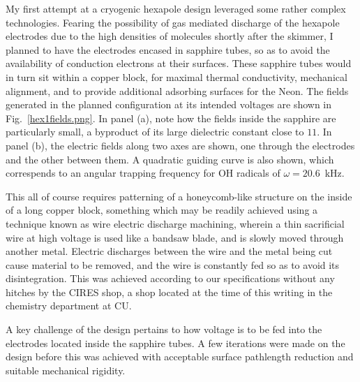 My first attempt at a cryogenic hexapole design leveraged some rather complex technologies.
Fearing the possibility of gas mediated discharge of the hexapole electrodes due to the high densities of molecules shortly after the skimmer, I planned to have the electrodes encased in sapphire tubes, so as to avoid the availability of conduction electrons at their surfaces.
These sapphire tubes would in turn sit within a copper block, for maximal thermal conductivity, mechanical alignment, and to provide additional adsorbing surfaces for the Neon.
The fields generated in the planned configuration at its intended voltages are shown in Fig.~\ref{hex1fields.png}.
In panel (a), note how the fields inside the sapphire are particularly small, a byproduct of its large dielectric constant close to $11$.
In panel (b), the electric fields along two axes are shown, one through the electrodes and the other between them.
A quadratic guiding curve is also shown, which correspends to an angular trapping frequency for OH radicals of $\omega=20.6$~kHz.


This all of course requires patterning of a honeycomb-like structure on the inside of a long copper block, something which may be readily achieved using a technique known as wire electric discharge machining, wherein a thin sacrificial wire at high voltage is used like a bandsaw blade, and is slowly moved through another metal.
Electric discharges between the wire and the metal being cut cause material to be removed, and the wire is constantly fed so as to avoid its disintegration.
This was achieved according to our specifications without any hitches by the CIRES shop, a shop located at the time of this writing in the chemistry department at CU.

A key challenge of the design pertains to how voltage is to be fed into the electrodes located inside the sapphire tubes.
A few iterations were made on the design before this was achieved with acceptable surface pathlength reduction and suitable mechanical rigidity.

